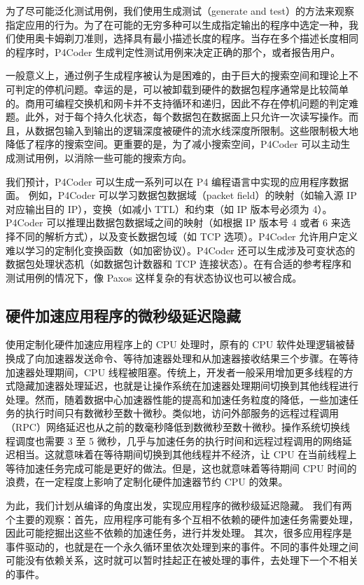 为了尽可能泛化测试用例，我们使用生成测试（generate and test）的方法来观察指定应用的行为。为了在可能的无穷多种可以生成指定输出的程序中选定一种，我们使用奥卡姆剃刀准则，选择具有最小描述长度的程序。当存在多个描述长度相同的程序时，P4Coder 生成判定性测试用例来决定正确的那个，或者报告用户。

一般意义上，通过例子生成程序被认为是困难的，由于巨大的搜索空间和理论上不可判定的停机问题。幸运的是，可以被卸载到硬件的数据包程序通常是比较简单的。商用可编程交换机和网卡并不支持循环和递归，因此不存在停机问题的判定难题。此外，对于每个持久化状态，每个数据包在数据面上只允许一次读写操作。而且，从数据包输入到输出的逻辑深度被硬件的流水线深度所限制。这些限制极大地降低了程序的搜索空间。更重要的是，为了减小搜索空间，P4Coder 可以主动生成测试用例，以消除一些可能的搜索方向。

我们预计，P4Coder 可以生成一系列可以在 P4 编程语言中实现的应用程序数据面。
例如，P4Coder 可以学习数据包数据域（packet field）的映射（如输入源 IP 对应输出目的 IP），变换（如减小 TTL）和约束（如 IP 版本号必须为 4）。P4Coder 可以推理出数据包数据域之间的映射（如根据 IP 版本号 4 或者 6 来选择不同的解析方式），以及变长数据包域（如 TCP 选项）。P4Coder 允许用户定义难以学习的定制化变换函数（如加密协议）。P4Coder 还可以生成涉及可变状态的数据包处理状态机（如数据包计数器和 TCP 连接状态）。在有合适的参考程序和测试用例的情况下，像 Paxos 这样复杂的有状态协议也可以被合成。

\subsection{硬件加速应用程序的微秒级延迟隐藏}

使用定制化硬件加速应用程序上的 CPU 处理时，原有的 CPU 软件处理逻辑被替换成了向加速器发送命令、等待加速器处理和从加速器接收结果三个步骤。在等待加速器处理期间，CPU 线程被阻塞。传统上，开发者一般采用增加更多线程的方式隐藏加速器处理延迟，也就是让操作系统在加速器处理期间切换到其他线程进行处理。然而，随着数据中心加速器性能的提高和加速任务粒度的降低，一些加速任务的执行时间只有数微秒至数十微秒。类似地，访问外部服务的远程过程调用（RPC）网络延迟也从之前的数毫秒降低到数微秒至数十微秒。操作系统切换线程调度也需要 3 至 5 微秒，几乎与加速任务的执行时间和远程过程调用的网络延迟相当。这就意味着在等待期间切换到其他线程并不经济，让 CPU 在当前线程上等待加速任务完成可能是更好的做法。但是，这也就意味着等待期间 CPU 时间的浪费，在一定程度上影响了定制化硬件加速器节约 CPU 的效果。

为此，我们计划从编译的角度出发，实现应用程序的微秒级延迟隐藏。
我们有两个主要的观察：首先，应用程序可能有多个互相不依赖的硬件加速任务需要处理，因此可能挖掘出这些不依赖的加速任务，进行并发处理。
其次，很多应用程序是事件驱动的，也就是在一个永久循环里依次处理到来的事件。不同的事件处理之间可能没有依赖关系，这时就可以暂时挂起正在被处理的事件，去处理下一个不相关的事件。

